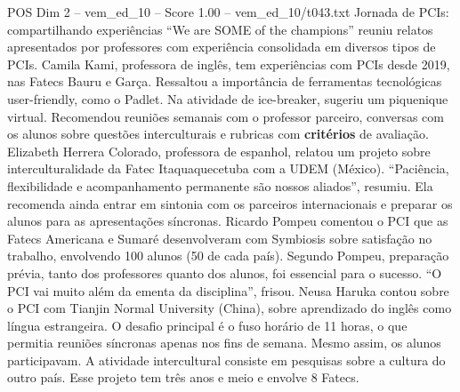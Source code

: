 \begin{textsample}{POS Dim 2 – vem\_ed\_10 – Score 1.00 – vem\_ed\_10/t043.txt}  \label{ex:f2_pos_189}
Jornada de PCIs: compartilhando experiências “We are SOME of the champions” reuniu relatos apresentados por professores com experiência consolidada em diversos tipos de PCIs.
Camila Kami, professora de inglês, tem experiências com PCIs desde 2019, nas Fatecs Bauru e Garça.
Ressaltou a importância de ferramentas tecnológicas user-friendly, como o Padlet.
Na atividade de ice-breaker, sugeriu um piquenique virtual.
Recomendou reuniões semanais com o professor parceiro, conversas com os alunos sobre questões interculturais e rubricas com \textbf{critérios} de avaliação.
Elizabeth Herrera Colorado, professora de espanhol, relatou um projeto sobre interculturalidade da Fatec Itaquaquecetuba com a UDEM (México). “Paciência, flexibilidade e acompanhamento permanente são nossos aliados”, resumiu.
Ela recomenda ainda entrar em sintonia com os parceiros internacionais e preparar os alunos para as apresentações síncronas.
Ricardo Pompeu comentou o PCI que as Fatecs Americana e Sumaré desenvolveram com Symbiosis sobre satisfação no trabalho, envolvendo 100 alunos (50 de cada país).
Segundo Pompeu, preparação prévia, tanto dos professores quanto dos alunos, foi essencial para o sucesso. “O PCI vai muito além da ementa da disciplina”, frisou.
Neusa Haruka contou sobre o PCI com Tianjin Normal University (China), sobre aprendizado do inglês como língua estrangeira.
O desafio principal é o fuso horário de 11 horas, o que permitia reuniões síncronas apenas nos fins de semana.
Mesmo assim, os alunos participavam.
A atividade intercultural consiste em pesquisas sobre a cultura do outro país.
Esse projeto tem três anos e meio e envolve 8 Fatecs.

\end{textsample}
